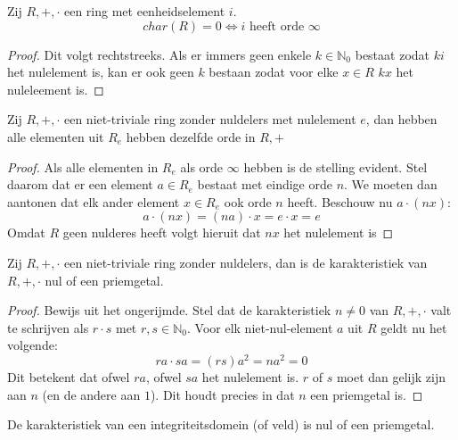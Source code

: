 \documentclass[main.tex]{subfiles}
\begin{document}
\begin{gev}
  Zij $R,+,\cdot$ een ring met eenheidselement $i$.
  \[ char(R) = 0 \Leftrightarrow i \text{ heeft orde } \infty \]

  \begin{proof}
    Dit volgt rechtstreeks.
    Als er immers geen enkele $k\in \mathbb{N}_{0}$ bestaat zodat $ki$ het nulelement is, kan er ook geen $k$ bestaan zodat voor elke $x\in R$ $kx$ het nuleleement is.
  \end{proof}
\end{gev}

\begin{st}
  Zij $R,+,\cdot$ een niet-triviale ring zonder nuldelers met nulelement $e$, dan hebben alle elementen uit $R_{e}$ hebben dezelfde orde in $R,+$

  \begin{proof}
    Als alle elementen in $R_{e}$ als orde $\infty$ hebben is de stelling evident.
    Stel daarom dat er een element $a\in R_{e}$ bestaat met eindige orde $n$.
    We moeten dan aantonen dat elk ander element $x\in R_{e}$ ook orde $n$ heeft.
    Beschouw nu $a \cdot (nx)$:
    \[ a \cdot (nx) = (na) \cdot x = e \cdot x = e \]
    Omdat $R$ geen nulderes heeft volgt hieruit dat $nx$ het nulelement is
  \end{proof}
\end{st}

\begin{st}
 Zij $R,+,\cdot$ een niet-triviale ring zonder nuldelers, dan is de karakteristiek van $R,+,\cdot$ nul of een priemgetal.
 
 \begin{proof}
   Bewijs uit het ongerijmde.
   Stel dat de karakteristiek $n\neq 0$ van $R,+,\cdot$ valt te schrijven als $r\cdot s$ met $r, s \in \mathbb{N}_{0}$.
   Voor elk niet-nul-element $a$ uit $R$ geldt nu het volgende:
   \[ ra \cdot sa = (rs)a^{2} = na^{2} = 0 \]
   Dit betekent dat ofwel $ra$, ofwel $sa$ het nulelement is.
   $r$ of $s$ moet dan gelijk zijn aan $n$ (en de andere aan $1$).
   Dit houdt precies in dat $n$ een priemgetal is.
 \end{proof}
\end{st}

\begin{gev}
  De karakteristiek van een integriteitsdomein (of veld) is nul of een priemgetal.
\end{gev}
\end{document}
